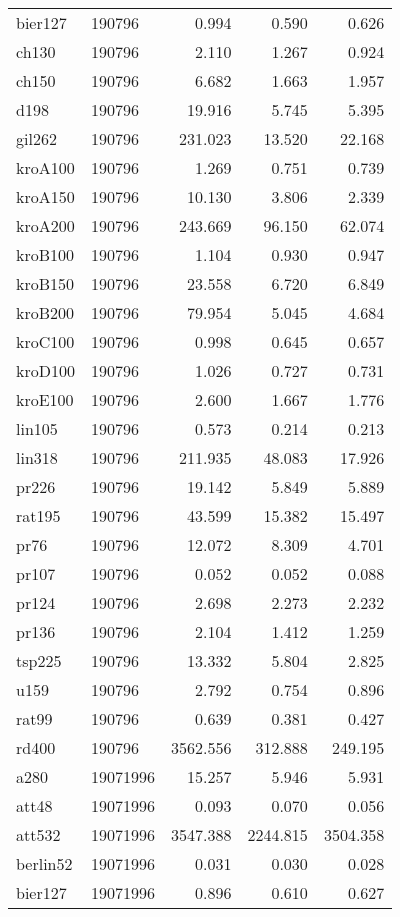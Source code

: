 \begin{center}
\begin{longtable}{llrrr}
bier127  & 190796 & 0.994 & 0.590 & 0.626\\
ch130  & 190796 & 2.110 & 1.267 & 0.924\\
ch150  & 190796 & 6.682 & 1.663 & 1.957\\
d198  & 190796 & 19.916 & 5.745 & 5.395\\
gil262  & 190796 & 231.023 & 13.520 & 22.168\\
kroA100  & 190796 & 1.269 & 0.751 & 0.739\\
kroA150  & 190796 & 10.130 & 3.806 & 2.339\\
kroA200  & 190796 & 243.669 & 96.150 & 62.074\\
kroB100  & 190796 & 1.104 & 0.930 & 0.947\\
kroB150  & 190796 & 23.558 & 6.720 & 6.849\\
kroB200  & 190796 & 79.954 & 5.045 & 4.684\\
kroC100  & 190796 & 0.998 & 0.645 & 0.657\\
kroD100  & 190796 & 1.026 & 0.727 & 0.731\\
kroE100  & 190796 & 2.600 & 1.667 & 1.776\\
lin105  & 190796 & 0.573 & 0.214 & 0.213\\
lin318  & 190796 & 211.935 & 48.083 & 17.926\\
pr226  & 190796 & 19.142 & 5.849 & 5.889\\
rat195  & 190796 & 43.599 & 15.382 & 15.497\\
pr76  & 190796 & 12.072 & 8.309 & 4.701\\
pr107  & 190796 & 0.052 & 0.052 & 0.088\\
pr124  & 190796 & 2.698 & 2.273 & 2.232\\
pr136  & 190796 & 2.104 & 1.412 & 1.259\\
tsp225  & 190796 & 13.332 & 5.804 & 2.825\\
u159  & 190796 & 2.792 & 0.754 & 0.896\\
rat99  & 190796 & 0.639 & 0.381 & 0.427\\
rd400  & 190796 & 3562.556 & 312.888 & 249.195\\
a280  & 19071996 & 15.257 & 5.946 & 5.931\\
att48  & 19071996 & 0.093 & 0.070 & 0.056\\
att532  & 19071996 & 3547.388 & 2244.815 & 3504.358\\
berlin52  & 19071996 & 0.031 & 0.030 & 0.028\\
bier127  & 19071996 & 0.896 & 0.610 & 0.627\\

\end{longtable}
\end{center}
